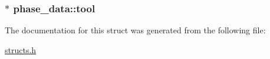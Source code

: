 \hypertarget{structphase__data_ad7745d032eb700e8126ac725c96e77f2}{
\subsubsection[{tool}]{$\ast$ phase\-\_\-data\-::tool}}\label{structphase__data_ad7745d032eb700e8126ac725c96e77f2}


The documentation for this struct was generated from the following file\-:\begin{DoxyCompactItemize}
\item 
\hyperlink{structs_8h}{structs.\-h}\end{DoxyCompactItemize}
